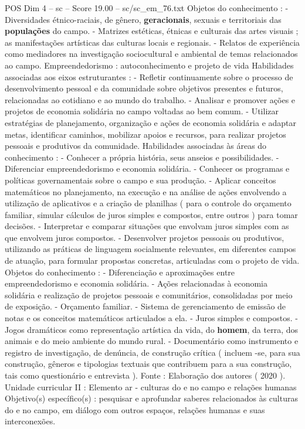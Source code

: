\begin{textsample}{POS Dim 4 – sc – Score 19.00 – sc/sc\_em\_76.txt}
Objetos do conhecimento : - Diversidades étnico-raciais, de gênero, \textbf{geracionais}, sexuais e territoriais das \textbf{populações} do campo. - Matrizes estéticas, étnicas e culturais das artes visuais ; as manifestações artísticas das culturas locais e regionais. - Relatos de experiência como mediadores na investigação sociocultural e ambiental de temas relacionados ao campo.
Empreendedorismo : autoconhecimento e projeto de vida Habilidades associadas aos eixos estruturantes : - Refletir continuamente sobre o processo de desenvolvimento pessoal e da comunidade sobre objetivos presentes e futuros, relacionadas ao cotidiano e ao mundo do trabalho. - Analisar e promover ações e projetos de economia solidária no campo voltadas ao bem comum. - Utilizar estratégias de planejamento, organização e ações de economia solidária e adaptar metas, identificar caminhos, mobilizar apoios e recursos, para realizar projetos pessoais e produtivos da comunidade.
Habilidades associadas às áreas do conhecimento : - Conhecer a própria história, seus anseios e possibilidades. - Diferenciar empreendedorismo e economia solidária. - Conhecer os programas e políticas governamentais sobre o campo e sua produção. - Aplicar conceitos matemáticos no planejamento, na execução e na análise de ações envolvendo a utilização de aplicativos e a criação de planilhas ( para o controle do orçamento familiar, simular cálculos de juros simples e compostos, entre outros ) para tomar decisões. - Interpretar e comparar situações que envolvam juros simples com as que envolvem juros compostos. - Desenvolver projetos pessoais ou produtivos, utilizando as práticas de linguagem socialmente relevantes, em diferentes campos de atuação, para formular propostas concretas, articuladas com o projeto de vida.
Objetos do conhecimento : - Diferenciação e aproximações entre empreendedorismo e economia solidária. - Ações relacionadas à economia solidária e realização de projetos pessoais e comunitários, consolidadas por meio de exposição. - Orçamento familiar. - Sistema de gerenciamento de emissão de notas e os conceitos matemáticos articulados a ela. - Juros simples e compostos. - Jogos dramáticos como representação artística da vida, do \textbf{homem}, da terra, dos animais e do meio ambiente do mundo rural. - Documentário como instrumento e registro de investigação, de denúncia, de construção crítica ( incluem -se, para sua construção, gêneros e tipologias textuais que contribuem para a sua construção, tais como questionário e entrevista ).
Fonte : Elaboração dos autores ( 2020 ).
Unidade curricular II : Elemento ar - culturas do e no campo e relações humanas Objetivo(s) específico(s) : pesquisar e aprofundar saberes relacionados às culturas do e no campo, em diálogo com outros espaços, relações humanas e suas interconexões.

\end{textsample}
